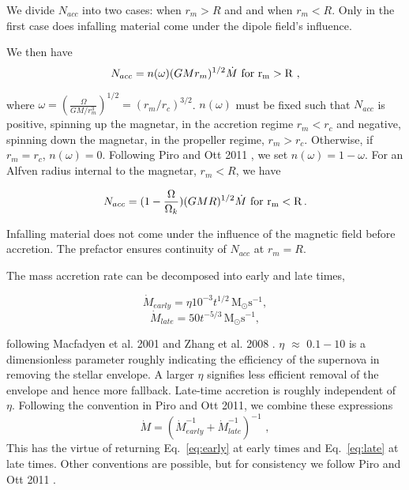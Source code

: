 \documentclass{article}
\begin{document}
We divide $N_{acc}$ into two cases: when $r_m>R$ and and when $r_m<R$. Only in the first case does infalling material come under the dipole field's influence.

We then have
\begin{equation}
N_{acc}= n(\omega) (GMr_m)^{1/2} \dot{M}\, \,  \rm{for \,\, r_m>R}\,\,,
\end{equation}

where $\omega=(\frac{\Omega}{GM/r_m^3})^{1/2}=(r_m/r_c)^{3/2}$. $n(\omega)$ must be fixed such that $N_{acc}$ is positive, spinning up the magnetar, in the accretion regime $r_m<r_c$ and negative, spinning down the magnetar, in the propeller regime, $r_m>r_c$. Otherwise, if $r_m=r_c$, $n(\omega)=0$. Following Piro and Ott 2011 \cite{Piro:2011ed}, we set $n(\omega)=1-\omega$. For an Alfven radius internal to the magnetar, $r_m<R$, we have

\begin{equation}
N_{acc}=(1-\frac{\Omega}{\Omega_k})(GMR)^{1/2} \dot{M}\, \,  \rm{for \,\, r_m<R}\,.
\end{equation}

Infalling material does not come under the influence of the magnetic field before accretion. The prefactor ensures continuity of $N_{acc}$ at $r_m=R$.

The mass accretion rate can be decomposed into early and late times,

\begin{equation} \label{eq:early}
\dot{M}_{early} = \eta 10^{-3}t^{1/2} \, \mathrm{M_{\odot }s^{-1}},
\end{equation}
\begin{equation} \label{eq:late}
\dot{M}_{late}=50 t^{-5/3}\, \mathrm{M_{\odot} s^{-1}},
\end{equation}

following Macfadyen et al. 2001 \cite{Macfadyen:1999mk} and Zhang et al. 2008 \cite{Zhang:2007nw}. $\eta$ $\approx$ $0.1-10$ is a dimensionless parameter roughly indicating the efficiency of the supernova in removing the stellar envelope. A larger $\eta$ signifies less efficient removal of the envelope and hence more fallback. Late-time accretion is roughly independent of $\eta$.
Following the convention in Piro and Ott 2011, we combine these expressions
\begin{equation}
\dot{M}=(\dot{M}_{early}^{-1}+\dot{M}_{late}^{-1})^{-1}\,\,,
\end{equation}
This has the virtue of returning Eq.~\ref{eq:early} at early times and Eq.~\ref{eq:late} at late times. Other conventions are possible, but for consistency we follow Piro and Ott 2011 \cite{Piro:2011ed}.
\end{document}
